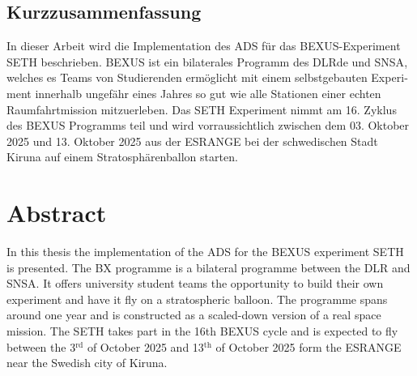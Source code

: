 \begin{otherlanguage}{ngerman}
\section*{Kurzzusammenfassung}
In dieser Arbeit wird die Implementation des \acf{ADS} für das \acs{BEXUS}-Experiment \ac{SETH} beschrieben. \acf{BEXUS} ist ein bilaterales Programm des \acf{DLRde} und \acf{SNSA}, welches es Teams von Studierenden ermöglicht mit einem selbstgebauten Experiment innerhalb ungefähr eines Jahres so gut wie alle Stationen einer echten Raumfahrtmission mitzuerleben. Das \ac{SETH} Experiment nimmt am 16. Zyklus des \ac{BEXUS} Programms teil und wird vorraussichtlich zwischen dem 03. Oktober 2025 und 13. Oktober 2025 aus der \ac{ESRANGE} bei der schwedischen Stadt Kiruna auf einem Stratosphärenballon starten.
\end{otherlanguage}


\section*{Abstract}
In this thesis the implementation of the \acf{ADS} for the \acf{BEXUS} experiment \acf{SETH} is presented. The \acf{BX} programme is a bilateral programme between the \acf{DLR} and \acf{SNSA}. It offers university student teams the opportunity to build their own experiment and have it fly on a stratospheric balloon. The programme spans around one year and is constructed as a scaled-down version of a real space mission. The \acf{SETH} takes part in the 16th \ac{BEXUS} cycle and is expected to fly between the 3$^\mathrm{rd}$ of October 2025 and 13$^\mathrm{th}$ of October 2025 form the \acf{ESRANGE} near the Swedish city of Kiruna.